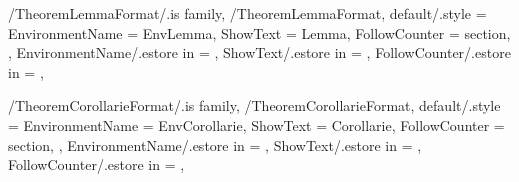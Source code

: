 \newcommand{\InitTheoremExampleFormat}
{%
  \theoremstyle{definition}%
  \ifthenelse{\equal{\GetTheoremExampleFormatFollowCounter}{\empty}}%
  {%
    \newtheorem{%
      \GetTheoremExampleFormatEnvironmentName}{%
      \GetTheoremExampleFormatShowText}%
  }%
  {%
    \newtheorem{%
      \GetTheoremExampleFormatEnvironmentName}{%
      \GetTheoremExampleFormatShowText}[%
      \GetTheoremExampleFormatFollowCounter]%
  }%
} %


\pgfkeys
{
  /TheoremLemmaFormat/.is family, /TheoremLemmaFormat,
  default/.style =
  {
    EnvironmentName = {EnvLemma},
    ShowText = {Lemma},
    FollowCounter = section,
  },
  EnvironmentName/.estore in = \GetTheoremLemmaFormatEnvironmentName,
  ShowText/.estore in = \GetTheoremLemmaFormatShowText,
  FollowCounter/.estore in = \GetTheoremLemmaFormatFollowCounter,
} %

\newcommand{\InsertLemma}[2][\empty]
{%
  \InsertTheoremContent[#1]{\GetTheoremLemmaFormatEnvironmentName}{#2}%
} %

\newcommand{\InitTheoremLemmaFormat}
{%
  \theoremstyle{plain}%
  \ifthenelse{\equal{\GetTheoremLemmaFormatFollowCounter}{\empty}}%
  {%
    \newtheorem{%
      \GetTheoremLemmaFormatEnvironmentName}{%
      \GetTheoremLemmaFormatShowText}%
  }%
  {%
    \newtheorem{%
      \GetTheoremLemmaFormatEnvironmentName}{%
      \GetTheoremLemmaFormatShowText}[%
      \GetTheoremLemmaFormatFollowCounter]%
  }%
} %


\pgfkeys
{
  /TheoremCorollarieFormat/.is family, /TheoremCorollarieFormat,
  default/.style =
  {
    EnvironmentName = {EnvCorollarie},
    ShowText = {Corollarie},
    FollowCounter = section,
  },
  EnvironmentName/.estore in = \GetTheoremCorollarieFormatEnvironmentName,
  ShowText/.estore in = \GetTheoremCorollarieFormatShowText,
  FollowCounter/.estore in = \GetTheoremCorollarieFormatFollowCounter,
} %

\newcommand{\InsertCorollarie}[2][\empty]
{%
  \InsertTheoremContent[#1]{\GetTheoremCorollarieFormatEnvironmentName}{#2}%
} %

\newcommand{\InitTheoremCorollarieFormat}
{%
  \theoremstyle{plain}%
  \ifthenelse{\equal{\GetTheoremCorollarieFormatFollowCounter}{\empty}}%
  {%
    \newtheorem{%
      \GetTheoremCorollarieFormatEnvironmentName}{%
      \GetTheoremCorollarieFormatShowText}%
  }%
  {%
    \newtheorem{%
      \GetTheoremCorollarieFormatEnvironmentName}{%
      \GetTheoremCorollarieFormatShowText}[%
      \GetTheoremCorollarieFormatFollowCounter]%
  }%
} %

